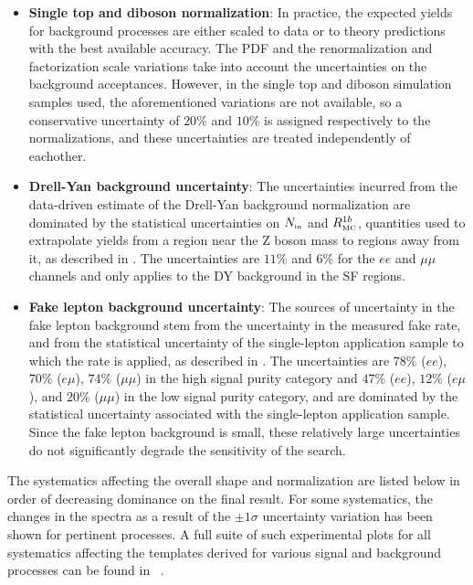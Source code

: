 \begin{itemize}
  \item \textbf{Single top and diboson normalization}: In practice, the expected yields for background processes are either scaled to data or to theory predictions with the best available accuracy. The PDF and the renormalization and factorization scale variations take into account the uncertainties on the background acceptances. However, in the single top and diboson simulation samples used, the aforementioned variations are not available, so a conservative uncertainty of $20\%$ and $10\%$ is assigned respectively to the normalizations, and these uncertainties are treated independently of eachother.  
\item \textbf{Drell-Yan background uncertainty}: The uncertainties incurred from the data-driven estimate of the Drell-Yan background normalization are dominated by the statistical uncertainties on $N_{\mbox{\tiny{in}}}$ and $R^{1b}_{\mbox{\tiny{MC}}}$, quantities used to extrapolate yields from a region near the Z boson mass to regions away from it, as described in . The uncertainties are $11\%$ and $6\%$ for the $ee$ and $\mu\mu$ channels and only applies to the DY background in the SF regions.
\item \textbf{Fake lepton background uncertainty}:
The sources of uncertainty in the fake lepton background stem from the uncertainty in the measured fake rate, and from the statistical uncertainty of the single-lepton application sample to which the rate is applied, as described in . The uncertainties are $78\%$ ($ee$), $70\%$ ($e\mu$), $74\%$ ($\mu\mu$) in the high signal purity category and $47\%$ ($ee$), $12\%$ ($e\mu$), and $20\%$ ($\mu\mu$) in the low signal purity category, and are dominated by the statistical uncertainty associated with the single-lepton application sample. Since the fake lepton background is small, these relatively large uncertainties do not significantly degrade the sensitivity of the search.
\end{itemize}

The systematics affecting the overall \ptmiss shape and normalization are listed below in order of decreasing dominance on the final result. For some systematics, the changes in the \ptmiss spectra as a result of the $\pm 1\sigma$ uncertainty variation has been shown for pertinent processes. A full suite of such experimental plots for all systematics affecting the \ptmiss templates derived for various signal and background processes can be found in ~\AppendixRef{}.

